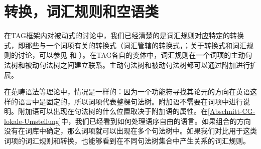 \section{转换，词汇规则和空语类}
\label{Abschnitt-leere-Elemente-LRs-Transformations}

在TAG框架内对被动式的讨论中，我们已经清楚的是词汇规则对应特定的转换式，即那些与一个词项有关的转换式（词汇管辖的转换式，\citet{Dowty78a}；关于转换式和词汇规则的讨论，可以参见 和 ）。在TAG\indextagc 各自的变体中，词汇规则在一个词项的主动句法树和被动句法树之间建立联系。主动句法树和被动句法树都可以通过附加进行扩展。

在范畴语法\indexcgc 等理论中，情况是一样的：因为一个功能符寻找其论元的方向在英语这样的语言中是固定的，所以词项代表整棵句法树。附加语不需要在词项中进行说明。附加语可以出现在句法树的什么位置取决于附加语的属性。在\ref{Abschnitt-CG-lokale-Umstellung}中，我们已经看到如何处理语序自由的语言。如果组合的方向没有在词库中确定，那么词项就可以出现在多个句法树中。如果我们对比用于这类词项的词汇规则和转换，也能够看到在不同句法树集合中产生关系的词汇规则。

